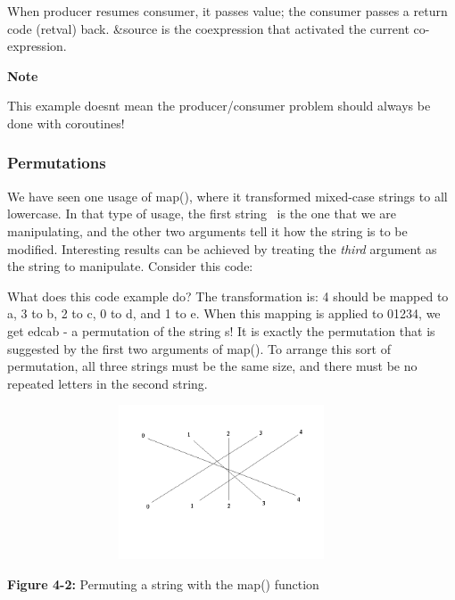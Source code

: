 When producer resumes consumer, it passes \textsf{value}; the consumer
passes a return code (\textsf{retval}) back. \textsf{\&source} is the
coexpression that activated the current co-expression.

{\sffamily\bfseries
Note}

{\sffamily
This example doesn{\textquotesingle}t mean the producer/consumer problem
should always be done with coroutines!}

\subsubsection[Permutations]{Permutations}

We have seen one usage of
\textsf{map()}, where it transformed mixed-case strings to
all lowercase. In that type of usage, the first string \ is the one
that we are manipulating, and the other two arguments tell it how the
string is to be modified. Interesting results can be achieved by
treating the \textit{third} argument as the string to manipulate.
Consider this code:


What does this code example do? The transformation is:
\textsf{{\textquotedbl}4{\textquotedbl}} should be mapped to
\textsf{{\textquotedbl}a{\textquotedbl}},
\textsf{{\textquotedbl}3{\textquotedbl}} to
\textsf{{\textquotedbl}b{\textquotedbl}},
\textsf{{\textquotedbl}2{\textquotedbl}} to
\textsf{{\textquotedbl}c{\textquotedbl}},
\textsf{{\textquotedbl}0{\textquotedbl}} to
\textsf{{\textquotedbl}d{\textquotedbl}}, and
\textsf{{\textquotedbl}1{\textquotedbl}} to
\textsf{{\textquotedbl}e{\textquotedbl}}. When this mapping is applied
to \textsf{{\textquotedbl}01234{\textquotedbl}}, we get
\textsf{{\textquotedbl}edcab{\textquotedbl}} - a permutation of the
string \textsf{s}! It is exactly the permutation that is suggested by
the first two arguments of \textsf{map()}. To arrange this sort of
permutation, all three strings must be the same size, and there must be
no repeated letters in the second string.


\begin{center}
\includegraphics[width=5.0in,height=1.8in]{ub-img/ub-img9.png}
\end{center}
{\sffamily\bfseries Figure 4-2:}
{\sffamily Permuting a string with the map() function}

